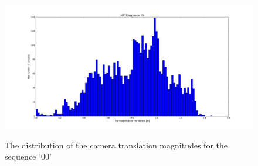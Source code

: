 \documentclass{article}
\begin{document}
\begin{figure}[ht]
  \includegraphics[width=4.5in]{00_t_distribution}
  \label{fig:t_distrib}
  \caption{The distribution of the camera translation magnitudes for the
    sequence '00'}
\end{figure}
\end{document}
